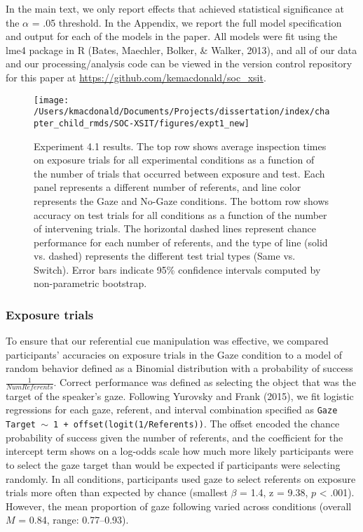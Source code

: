\documentclass[oneside]{report}
\begin{document}
In the main text, we only report effects that achieved statistical
significance at the \(\alpha\) = .05 threshold. In the Appendix, we
report the full model specification and output for each of the models in
the paper. All models were fit using the lme4 package in R (Bates,
Maechler, Bolker, \& Walker, 2013), and all of our data and our
processing/analysis code can be viewed in the version control repository
for this paper at \url{https://github.com/kemacdonald/soc_xsit}.
\begin{figure}[t]

{\centering \texttt{[image: /Users/kmacdonald/Documents/Projects/dissertation/index/chapter\_child\_rmds/SOC-XSIT/figures/expt1\_new]} 

}

\caption[Experiment 4.1 results.]{Experiment 4.1 results. The top row shows average inspection times on exposure trials for all experimental conditions as a function of the number of trials that occurred between exposure and test. Each panel represents a different number of referents, and line color represents the Gaze and No-Gaze conditions. The bottom row shows accuracy on test trials for all conditions as a function of the number of intervening trials. The horizontal dashed lines represent chance performance for each number of referents, and the type of line (solid vs. dashed) represents the different test trial types (Same vs. Switch). Error bars indicate 95\% confidence intervals computed by non-parametric bootstrap.}\label{fig:expt1-plot}
\end{figure}
\hypertarget{exposure-trials}{%
\subsubsection{Exposure trials}\label{exposure-trials}}

To ensure that our referential cue manipulation was effective, we
compared participants' accuracies on exposure trials in the Gaze
condition to a model of random behavior defined as a Binomial
distribution with a probability of success \(\frac{1}{Num Referents}\).
Correct performance was defined as selecting the object that was the
target of the speaker's gaze. Following Yurovsky and Frank (2015), we
fit logistic regressions for each gaze, referent, and interval
combination specified as
\texttt{Gaze Target $\sim$ 1 + offset(logit(1/Referents))}. The offset
encoded the chance probability of success given the number of referents,
and the coefficient for the intercept term shows on a log-odds scale how
much more likely participants were to select the gaze target than would
be expected if participants were selecting randomly. In all conditions,
participants used gaze to select referents on exposure trials more often
than expected by chance (smallest \(\beta\) = 1.4, z = 9.38, \(p\)
\textless{} .001). However, the mean proportion of gaze following varied
across conditions (overall \(M\) = 0.84, range: 0.77--0.93).
\end{document}
